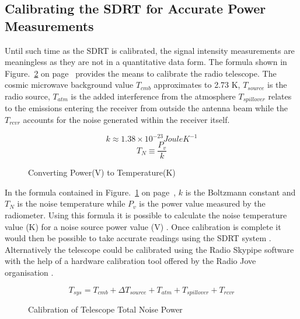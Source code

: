 \subsection*{Calibrating the SDRT for Accurate Power Measurements}

Until such time as the SDRT is calibrated, the signal intensity measurements are meaningless as they are not in a quantitative data form. The formula shown in Figure.~\ref{fig:telescope_calibration} on page~\pageref{fig:telescope_calibration} provides the means to calibrate the radio telescope. The cosmic microwave background value $T_{cmb}$  approximates to 2.73 K, $T_{source}$ is the radio source, $T_{atm}$ is the added interference from the atmosphere $T_{spillover}$ relates to the emissions entering the receiver from outside the antenna beam while the $T_{rcvr}$ accounts for the noise generated within the receiver itself.

%
\begin{figure}[here]
	\centering
	\begin{equation}
	k \approx 1.38 \times 10^{-23} Joule K^{-1}
	\end{equation}
	\begin{equation}
	T_N \equiv \frac{P_v}{k}
	\end{equation}
	\caption{Converting Power(V) to Temperature(K)}
	\label{fig:power_to_kelvin_formula}
\end{figure}
%

In the formula contained in Figure.~\ref{fig:power_to_kelvin_formula} on page~\pageref{fig:power_to_kelvin_formula}, $k$ is the Boltzmann constant and $T_N$ is the noise temperature while $P_v$ is the power value measured by the radiometer. Using this formula it is possible to calculate the noise temperature value (K) for a noise source power value (V) \citep{nrao-10}. Once calibration is complete it would then be possible to take accurate readings using the SDRT system \citep{nrao-10}. Alternatively the telescope could be calibrated using the Radio Skypipe software with the help of a hardware calibration tool offered by the Radio Jove organisation \citep{rsp-15} \citep{nasa10}.

%
\begin{figure}[here]
	\centering
	\begin{equation}
	T_{sys} = T_{cmb} + \Delta{T_{source}} + T_{atm} + T_{spillover} + T_{rcvr}
	\end{equation}
	\caption{Calibration of Telescope Total Noise Power}
	\label{fig:telescope_calibration}
\end{figure}
%

